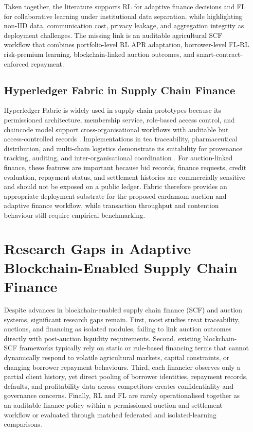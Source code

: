 \documentclass[12pt]{article}
\begin{document}
Taken together, the literature supports RL for adaptive finance decisions and FL for collaborative learning under institutional data separation, while highlighting non-IID data, communication cost, privacy leakage, and aggregation integrity as deployment challenges. The missing link is an auditable agricultural SCF workflow that combines portfolio-level RL APR adaptation, borrower-level FL-RL risk-premium learning, blockchain-linked auction outcomes, and smart-contract-enforced repayment.

\subsection{Hyperledger Fabric in Supply Chain Finance}

Hyperledger Fabric is widely used in supply-chain prototypes because its permissioned architecture, membership service, role-based access control, and chaincode model support cross-organisational workflows with auditable but access-controlled records \citep{ma2019,khan2022,shih2022}. Implementations in tea traceability, pharmaceutical distribution, and multi-chain logistics demonstrate its suitability for provenance tracking, auditing, and inter-organisational coordination \citep{chen_hyperledger_2023,sudha_trackchain_2024,chou_implementing_2023}. For auction-linked finance, these features are important because bid records, finance requests, credit evaluation, repayment status, and settlement histories are commercially sensitive and should not be exposed on a public ledger. Fabric therefore provides an appropriate deployment substrate for the proposed cardamom auction and adaptive finance workflow, while transaction throughput and contention behaviour still require empirical benchmarking.

\section{Research Gaps in Adaptive Blockchain-Enabled Supply Chain Finance}

Despite advances in blockchain-enabled supply chain finance (SCF) and auction systems, significant research gaps remain. First, most studies treat traceability, auctions, and financing as isolated modules, failing to link auction outcomes directly with post-auction liquidity requirements. Second, existing blockchain-SCF frameworks typically rely on static or rule-based financing terms that cannot dynamically respond to volatile agricultural markets, capital constraints, or changing borrower repayment behaviours. Third, each financier observes only a partial client history, yet direct pooling of borrower identities, repayment records, defaults, and profitability data across competitors creates confidentiality and governance concerns. Finally, RL and FL are rarely operationalised together as an auditable finance policy within a permissioned auction-and-settlement workflow or evaluated through matched federated and isolated-learning comparisons.
	
\end{document}
